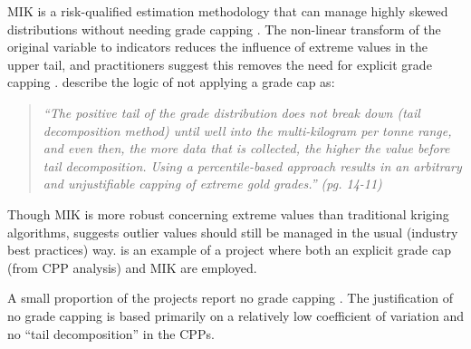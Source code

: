 

\Gls{MIK} is a risk-qualified estimation methodology that can manage highly skewed distributions without needing grade capping \citep{journel1983nonparametric}. The non-linear transform of the original variable to indicators reduces the influence of extreme values in the upper tail, and practitioners suggest this removes the need for explicit grade capping \citep{pretium2020, ngm2020, tristar2021, cardinal2019}. \cite{pretium2020} describe the logic of not applying a grade cap as:

\blockquote{\textit{``The positive tail of the grade distribution does
        not break down (tail decomposition method) until well into the multi-kilogram per tonne range, and even then, the more data that is collected, the higher the value before tail decomposition. Using a percentile-based approach results in an arbitrary and unjustifiable capping of extreme gold grades.'' (pg. 14-11)}}

Though \gls{MIK} is more robust concerning extreme values than traditional kriging algorithms, \cite{carvalho2017overview} suggests outlier values should still be managed in the usual (industry best practices) way. \cite{artemis2020} is an example of a project where both an explicit grade cap (from \gls{CPP} analysis) and \gls{MIK} are employed.

A small proportion of the projects report no grade capping \citep{medgold2021,pasofino2020,eldorado2020}. The justification of no grade capping is based primarily on a relatively low coefficient of variation and no ``tail decomposition'' in the \glspl{CPP}.

